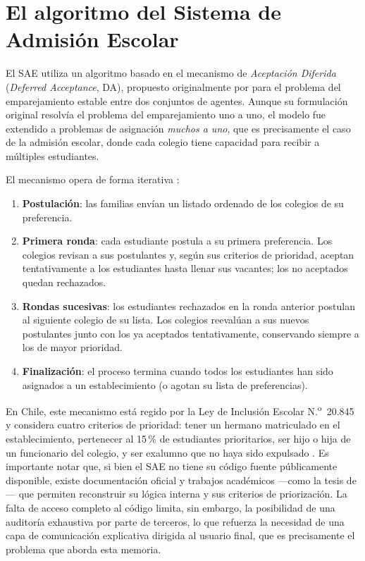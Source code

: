 \section{El algoritmo del Sistema de Admisión Escolar}

El SAE utiliza un algoritmo basado en el mecanismo de \emph{Aceptación Diferida} (\emph{Deferred Acceptance}, DA), propuesto originalmente por \citet{galeshapley1962} para el problema del emparejamiento estable entre dos conjuntos de agentes. Aunque su formulación original resolvía el problema del emparejamiento uno a uno, el modelo fue extendido a problemas de asignación \emph{muchos a uno}, que es precisamente el caso de la admisión escolar, donde cada colegio tiene capacidad para recibir a múltiples estudiantes.

El mecanismo opera de forma iterativa \citep{epstein2017mecanismos}:

\begin{enumerate}
    \item \textbf{Postulación}: las familias envían un listado ordenado de los colegios de su preferencia.
    \item \textbf{Primera ronda}: cada estudiante postula a su primera preferencia. Los colegios revisan a sus postulantes y, según sus criterios de prioridad, aceptan tentativamente a los estudiantes hasta llenar sus vacantes; los no aceptados quedan rechazados.
    \item \textbf{Rondas sucesivas}: los estudiantes rechazados en la ronda anterior postulan al siguiente colegio de su lista. Los colegios reevalúan a sus nuevos postulantes junto con los ya aceptados tentativamente, conservando siempre a los de mayor prioridad.
    \item \textbf{Finalización}: el proceso termina cuando todos los estudiantes han sido asignados a un establecimiento (o agotan su lista de preferencias).
\end{enumerate}

En Chile, este mecanismo está regido por la Ley de Inclusión Escolar N.\textsuperscript{o}~20.845 y considera cuatro criterios de prioridad: tener un hermano matriculado en el establecimiento, pertenecer al 15\,\% de estudiantes prioritarios, ser hijo o hija de un funcionario del colegio, y ser exalumno que no haya sido expulsado \citep{mineduc_sae}. Es importante notar que, si bien el SAE no tiene su código fuente públicamente disponible, existe documentación oficial y trabajos académicos —como la tesis de \citet{epstein2017mecanismos}— que permiten reconstruir su lógica interna y sus criterios de priorización. La falta de acceso completo al código limita, sin embargo, la posibilidad de una auditoría exhaustiva por parte de terceros, lo que refuerza la necesidad de una capa de comunicación explicativa dirigida al usuario final, que es precisamente el problema que aborda esta memoria.

